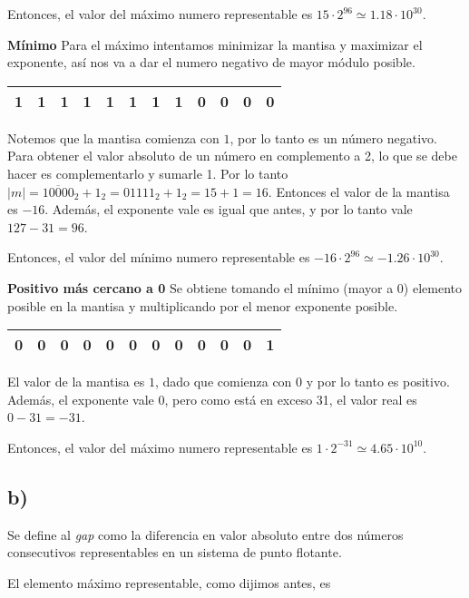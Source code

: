 \documentclass[hidelinks,a4paper,10pt, nofootinbib]{article}
\begin{document}
Entonces, el valor del máximo numero representable es $15 \cdot 2^{96} \simeq 1.18 \cdot 10^{30}$.


\textbf{Mínimo} Para el máximo intentamos minimizar la mantisa y maximizar el exponente, así nos va a dar el numero negativo de mayor módulo posible.
\begin{center}
\begin{tabular}{|c|c|c|c|c|c|c||c|c|c|c|c|}
\hline
1&1&1&1&1&1&1&1&0&0&0&0\\
\hline
\end{tabular}
\end{center}
Notemos que la mantisa comienza con $1$, por lo tanto es un número negativo. Para obtener el valor absoluto de un número en complemento a 2, lo que se debe hacer es complementarlo y sumarle 1. Por lo tanto $|m| = \overline{10000}_2 + 1_2 = 01111_2 + 1_2 = 15 + 1 = 16$. Entonces el valor de la mantisa es $-16$. Además, el exponente vale es igual que antes, y por lo tanto vale $127 - 31 = 96$.



Entonces, el valor del mínimo numero representable es $-16 \cdot 2^{96} \simeq -1.26 \cdot 10^{30}$.

\textbf{Positivo más cercano a 0} Se obtiene tomando el mínimo (mayor a 0) elemento posible en la mantisa y multiplicando por el menor exponente posible.

\begin{center}
\begin{tabular}{|c|c|c|c|c|c|c||c|c|c|c|c|}
\hline
0&0&0&0&0&0&0&0&0&0&0&1\\
\hline
\end{tabular}
\end{center}

El valor de la mantisa es $1$, dado que comienza con $0$ y por lo tanto es positivo.
Además, el exponente vale $0$, pero como está en exceso 31, el valor real es $0 - 31 = -31$.

Entonces, el valor del máximo numero representable es $1 \cdot 2^{-31} \simeq 4.65 \cdot 10^{10}$.

\subsection*{b)}
Se define al \emph{gap} como la diferencia en valor absoluto entre dos números consecutivos representables en un sistema de punto flotante.


El elemento máximo representable, como dijimos antes, es
\end{document}
